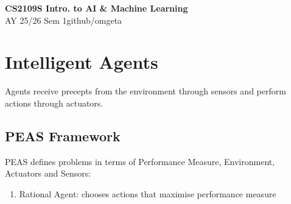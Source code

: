 \documentclass[12pt, a4paper]{article}
\newcommand{\mytitle}{CS2109S Intro. to AI \& Machine Learning}
\newcommand{\myauthor}{github/omgeta}
\newcommand{\mydate}{AY 25/26 Sem 1}
\begin{document}
\raggedright
\footnotesize
\begin{multicols*}{3}
\setlength{\premulticols}{1pt}
\setlength{\postmulticols}{1pt}
\setlength{\multicolsep}{1pt}
\setlength{\columnsep}{2pt}

{\normalsize{\textbf{\mytitle}}}\\
{\footnotesize{\mydate\hspace{2pt}\textemdash\hspace{2pt}\myauthor}}
\vspace{-0.5em}\section{Intelligent Agents}
Agents receive precepts from the environment through sensors and perform actions through actuators.

\subsection{PEAS Framework}
PEAS defines problems in terms of Performance Measure, Environment, Actuators and Sensors:
\begin{enumerate}[\roman*.]
  \item Rational Agent: chooses actions that maximise performance measure
\end{enumerate}
{\centering{}\par}


\end{multicols*}
\end{document}
